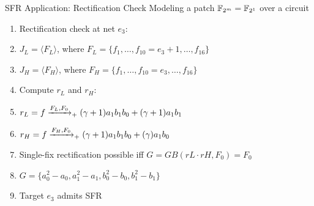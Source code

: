 \begin{frame}{\large SFR Application: Rectification Check}
	\vspace{0.1in}
	Modeling a patch ${\mathbb{F}}_{2^m} = {\mathbb{F}}_{2^1}$ over a circuit 
	\begin{enumerate}
		\item Rectification check at net $e_3$:
		\bi
			\item $J_L = \langle F_L\rangle$, where $F_L=\{f_1,\dots, f_{10}=e_3+1,\dots, f_{16}\}$
			\item $J_H = \langle F_H\rangle$, where $F_H = \{f_1,\dots, f_{10}=e_3,\dots, f_{16}\}$
		\ei
		\vspace{0.1in}
		\item Compute $r_L$ and $r_H$:
		\bi
			\item $r_L = f \xrightarrow[]{F_L, F_0}_+{(\gamma+1)a_1b_1b_0+(\gamma+1)a_1b_1}$
			\item $r_H = f \xrightarrow[]{F_H,F_0}_+{(\gamma+1)a_1b_1b_0+(\gamma)a_1b_0}$
		\ei
		\vspace{0.1in}
		\item Single-fix rectification possible iff $G = GB(rL\cdot rH, F_0)=F_0$
		\bi
			\item $G = \{a_0^2-a_0, a_1^2-a_1,b_0^2-b_0,b_1^2-b_1\}$
			\item Target $e_3$ admits SFR
		\ei
	\end{enumerate}
\end{frame}


